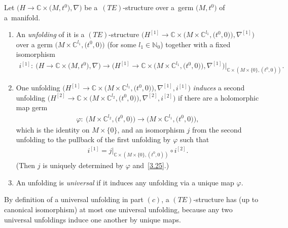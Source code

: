 \documentclass[pdftex]{sigma}%
\numberwithin{equation}{section}
\numberwithin{figure}{section}
\newcommand{\N}{{\mathbb N}}
\newcommand{\C}{{\mathbb C}}
\newcommand{\nnn}{\nabla}
\begin{document}
\begin{Definition}\label{t3.15}
Let $\big(H\to\C\times \big(M,t^0\big),\nnn\big)$ be a~$(TE)$-structure over a~germ $\big(M,t^0\big)$ of a~mani\-fold.
\begin{enumerate}\itemsep=0pt
\item[$(a)$] An {\it unfolding} of it is a $(TE)$-structure
$\big(H^{[1]}\to\C\times \big(M\times \C^{l_1},\big(t^0,0\big)\big),\nnn^{[1]}\big)$
over a germ $\big(M\times \C^{l_1},\big(t^0,0\big)\big)$
(for some $l_1\in\N_0$)
together with a fixed isomorphism
\begin{gather*}%
i^{[1]}\colon \ \big(H\to\C\times \big(M,t^0\big),\!\nnn\big)
\to \big(H^{[1]}\to\C\times \big(M\times \C^{l_1},\big(t^0,0\big)\big),
\!\nnn^{[1]}\big)|_{\C\times (M\times\{0\},(t^0,0))} .
\end{gather*}

\item[$(b)$] One unfolding $\big(H^{[1]}\to\C\times\big(M\times \C^{l_1},
\big(t^0,0\big)\big),\nnn^{[1]},i^{[1]}\big)$ {\it induces}
a second unfolding $\big(H^{[2]}\to\C\times\big(M\times \C^{l_2},
\big(t^0,0\big)\big),\nnn^{[2]},i^{[2]}\big)$ if there
are a holomorphic map germ
\begin{gather*}%
\varphi\colon\ \big(M\times \C^{l_2},\big(t^0,0\big)\big)\to \big(M\times \C^{l_1},\big(t^0,0\big)\big),
\end{gather*}
which is the identity on $M\times \{0\}$,
and an isomorphism $j$ from the second unfolding to the
pullback of the first unfolding by $\varphi$ such that
\begin{gather}\label{3.25}
i^{[1]}= j|_{\C\times (M\times \{0\},(t^0,0))}\circ i^{[2]}.
\end{gather}
(Then $j$ is uniquely determined by $\varphi$ and~\eqref{3.25}.)

\item[$(c)$] An unfolding is {\it universal} if it induces any unfolding
via a unique map $\varphi$.
\end{enumerate}
\end{Definition}

By definition of a universal unfolding in part $(c)$,
a $(TE)$-structure has (up to canonical isomorphism)
at most one universal unfolding, because any two universal
unfoldings induce one another by unique maps.
\end{document}
